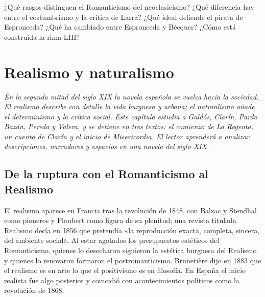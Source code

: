 \documentclass{book}
\begin{document}
\begin{tcolorbox}[title={Autoficha}, studiumcheck, breakable]

¿Qué rasgos distinguen el Romanticismo del neoclasicismo? ¿Qué diferencia hay entre el costumbrismo y la crítica de Larra? ¿Qué ideal defiende el pirata de Espronceda? ¿Qué ha cambiado entre Espronceda y Bécquer? ¿Cómo está construida la rima LIII?

\end{tcolorbox}

\chapter{Realismo y naturalismo}
\label{chap:lit-10}

\noindent\textit{En la segunda mitad del siglo XIX la novela española se vuelca hacia la sociedad. El realismo describe con detalle la vida burguesa y urbana; el naturalismo añade el determinismo y la crítica social. Este capítulo estudia a Galdós, Clarín, Pardo Bazán, Pereda y Valera, y se detiene en tres textos: el comienzo de La Regenta, un cuento de Clarín y el inicio de Misericordia. El lector aprenderá a analizar descripciones, narradores y espacios en una novela del siglo XIX.}


\section{De la ruptura con el Romanticismo al Realismo}

El realismo aparece en Francia tras la revolución de 1848, con Balzac y Stendhal como pioneros y Flaubert como figura de su plenitud; una revista titulada Realismo decía en 1856 que pretendía «la reproducción exacta, completa, sincera, del ambiente social». Al estar agotados los presupuestos estéticos del Romanticismo, quienes lo desecharon siguieron la estética burguesa del Realismo y quienes lo renovaron formaron el postromanticismo. Brunetière dijo en 1883 que el realismo es en arte lo que el positivismo es en filosofía. En España el inicio realista fue algo posterior y coincidió con acontecimientos políticos como la revolución de 1868.
\end{document}
